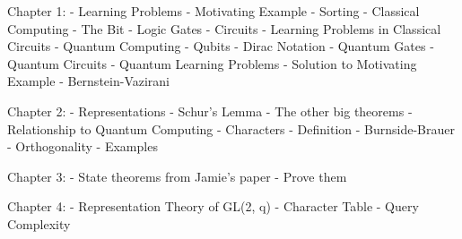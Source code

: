 \documentclass[12pt]{article}
\begin{document}
Chapter 1:
    - Learning Problems
        - Motivating Example
        - Sorting
    - Classical Computing
        - The Bit
        - Logic Gates
        - Circuits
        - Learning Problems in Classical Circuits
    - Quantum Computing
        - Qubits
        - Dirac Notation
        - Quantum Gates
        - Quantum Circuits
        - Quantum Learning Problems
            - Solution to Motivating Example
            - Bernstein-Vazirani

Chapter 2:
    - Representations
        - Schur's Lemma
        - The other big theorems
        - Relationship to Quantum Computing
    - Characters 
        - Definition
        - Burnside-Brauer
        - Orthogonality
        - Examples

Chapter 3: 
    - State theorems from Jamie's paper
    - Prove them 

Chapter 4:
    - Representation Theory of GL(2, q)
        - Character Table
    - Query Complexity
\end{document}
